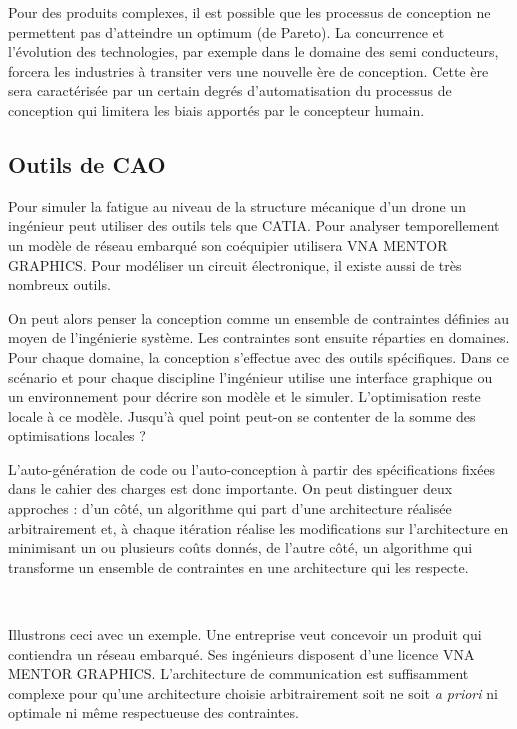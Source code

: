 Pour des produits complexes, il est possible que les processus de conception ne
permettent pas d'atteindre un optimum (de Pareto). La concurrence et l'évolution
des technologies, par exemple dans le domaine des semi conducteurs, forcera les
industries à transiter vers une nouvelle ère de conception. Cette ère sera
caractérisée par un certain degrés d'automatisation du processus de conception
qui limitera les biais apportés par le concepteur humain.

\subsection{Outils de CAO}

Pour simuler la fatigue au niveau de la structure mécanique d'un drone un
ingénieur peut utiliser des outils tels que CATIA. Pour analyser
temporellement un modèle de réseau embarqué son coéquipier utilisera VNA MENTOR
GRAPHICS. Pour modéliser un circuit électronique, il existe aussi de très
nombreux outils.

On peut alors penser la conception comme un ensemble de contraintes définies au
moyen de l'ingénierie système. Les contraintes sont ensuite réparties en
domaines. Pour chaque domaine, la conception s'effectue avec des outils
spécifiques. Dans ce scénario et pour chaque discipline l'ingénieur utilise une
interface graphique ou un environnement pour décrire son modèle et le simuler.
L'optimisation reste locale à ce modèle. Jusqu'à quel point peut-on se contenter
de la somme des optimisations locales ?

L’auto-génération de code ou l’auto-conception à partir des spécifications
fixées dans le cahier des charges est donc importante. On peut distinguer deux
approches : d'un côté, un algorithme qui part d’une architecture réalisée
arbitrairement et, à chaque itération réalise les modifications sur
l’architecture en minimisant un ou plusieurs coûts donnés, de l'autre côté, un
algorithme qui transforme un ensemble de contraintes en une architecture qui
les respecte.

~

Illustrons ceci avec un exemple. Une entreprise veut concevoir un produit qui
contiendra un réseau embarqué. Ses ingénieurs disposent d'une licence VNA MENTOR
GRAPHICS. L'architecture de communication est suffisamment complexe pour qu'une
architecture choisie arbitrairement soit ne soit \textit{a priori} ni optimale
ni même respectueuse des contraintes.

